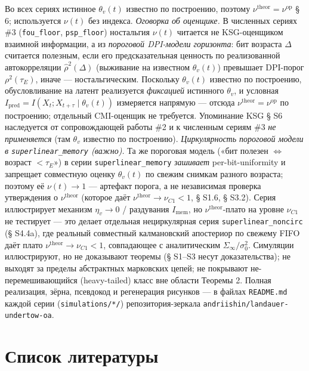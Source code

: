 \documentclass[12pt]{iopart}
\begin{document}
Во всех сериях истинное \(\theta_v(t)\) известно по построению, поэтому \(\nu^{\text{theor}} = \nu^{\text{op}}\) \cite{Andriishin2026b} § 6; используется \(\nu(t)\) без индекса. \emph{Оговорка об оценщике.} В численных сериях \#3 (\texttt{fou\_floor}, \texttt{psp\_floor}) ностальгия \(\nu(t)\) читается не KSG-оценщиком взаимной информации, а из \emph{пороговой DPI-модели горизонта}: бит возраста \(\Delta\) считается полезным, если его предсказательная ценность по реализованной автокорреляции \(\hat\rho^2(\Delta)\) (выживание на известном \(\theta_v(t)\)) превышает DPI-порог \(\rho^2(\tau_E)\), иначе --- ностальгическим. Поскольку \(\theta_v(t)\) известно по построению, обусловливание на латент реализуется \emph{фиксацией} истинного \(\theta_v\), и условная \(I_{\text{pred}} = I(X_t;X_{t+\tau}\mid\theta_v(t))\) измеряется напрямую --- отсюда \(\nu^{\text{theor}} = \nu^{\text{op}}\) по построению; отдельный CMI-оценщик не требуется. Упоминание KSG \cite{Andriishin2026b} § S6 наследуется от сопровождающей работы \#2 и к численным сериям \#3 \emph{не применяется} (там \(\theta_v\) известно по построению). \emph{Циркулярность пороговой модели в \texttt{superlinear\_memory} (важно).} Та же пороговая модель («бит полезен \(\Leftrightarrow\) возраст \(< \tau_E\)») в серии \texttt{superlinear\_memory} \emph{зашивает} per-bit-uniformity и запрещает совместную оценку \(\theta_v(t)\) по свежим снимкам разного возраста; поэтому её \(\nu(t) \to 1\) --- артефакт порога, а не независимая проверка утверждения о \(\nu^{\text{theor}}\) (которое даёт \(\nu^{\text{theor}} \to \nu_{C1} < 1\), § S1.6, § S3.2). Серия иллюстрирует механизм \(\eta_v \to 0\) / раздувания \(I_{\text{mem}}\), но \(\nu^{\text{theor}}\)-плато на уровне \(\nu_{C1}\) не тестирует --- это делает отдельная нециркулярная серия \texttt{superlinear\_noncirc} (§ S4.4a), где реальный совместный калмановский апостериор по свежему FIFO даёт плато \(\nu^{\text{theor}} \to \nu_{C1} < 1\), совпадающее с аналитическим \(\Sigma_\infty/\sigma_0^2\). Симуляции иллюстрируют, но не доказывают теоремы (§ S1--S3 несут доказательства); не выходят за пределы абстрактных марковских цепей; не покрывают не-перемешивающийся (heavy-tailed) класс вне области Теоремы 2. Полная реализация, зёрна, псевдокод и регенерация рисунков --- в файлах \texttt{README.md} каждой серии (\texttt{simulations/*/}) репозитория-зеркала \texttt{andriishin/landauer-undertow-oa}.



\section*{Список литературы}


\end{document}
